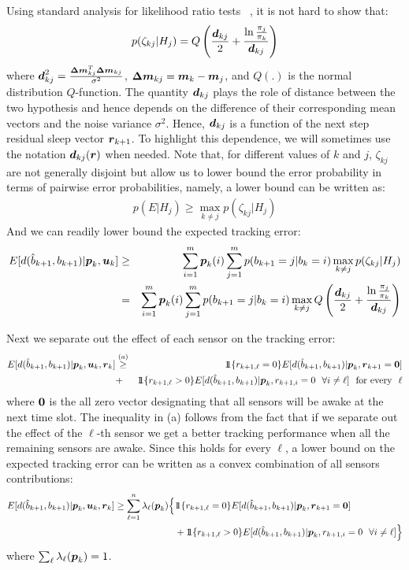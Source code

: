 \documentclass[journal,draftcls,onecolumn,11pt]{IEEEtran}
\newcommand{\emb}[1]{\text{\boldmath{$#1$}}}
\newcommand{\indic}[1]{\mbox{$1\!\!1$}{\{#1\}}}
\begin{document}
Using standard analysis for likelihood ratio tests ~\cite{poor,levy}, it is not hard to show that:
\begin{equation}
 p(\zeta_{kj}|H_j)=Q\left(\frac{\emb{d}_{kj}}{2}+\frac{\ln\frac{\pi_j}{\pi_k}}{\emb{d}_{kj}}\right)
 \end{equation}
where $\emb{d}^2_{kj}=\frac{\emb{\Delta m}_{kj}^T\emb{\Delta m}_{kj}}{\sigma^2}$, $\emb{\Delta m}_{kj}=\emb{m}_k-\emb{m}_j$, and $Q(.)$ is the normal distribution $Q$-function. The quantity $\emb{d}_{kj}$ plays the role of distance between the two hypothesis and hence depends on the difference of their corresponding mean vectors and the noise variance $\sigma^2$. Hence, $\emb{d}_{kj}$ is a function of the next step residual sleep vector $\emb{r}_{k+1}$. To highlight this dependence, we will sometimes use the notation $\emb{d}_{kj}(\emb{r})$ when needed. Note that, for different values of $k$ and $j$, $\zeta_{kj}$ are not generally disjoint but allow us to lower bound the error probability in terms of pairwise error probabilities, namely, a lower bound can be written as:
\begin{eqnarray}
p(E|H_j)\geq\max_{k\ne j} p(\zeta_{kj}|H_j)
\end{eqnarray}
And we can readily lower bound the expected tracking error:
\begin{eqnarray}
E[d(\hat{b}_{k+1},b_{k+1})|\emb{p}_k,\emb{u}_k]&\geq&\sum_{i=1}^m \emb{p}_k(i)\sum_{j=1}^m p(b_{k+1}=j|b_k=i)\max_{k\ne j} p(\zeta_{kj}|H_j)\nonumber\\
& = &\sum_{i=1}^m \emb{p}_k(i)\sum_{j=1}^m p(b_{k+1}=j|b_k=i)\max_{k\ne j}Q\left(\frac{\emb{d}_{kj}}{2}+\frac{\ln\frac{\pi_j}{\pi_k}}{\emb{d}_{kj}}\right)
\label{eq:lb_tracking}
\end{eqnarray}

Next we separate out the effect of each sensor on the tracking error:
\begin{eqnarray}
E[d(\hat{b}_{k+1},b_{k+1})|\emb{p}_k,\emb{u}_k,\emb{r}_k]&\buildrel (a)\over\geq&\indic{r_{k+1,\ell}=0}E[d(\hat{b}_{k+1},b_{k+1})|\emb{p}_k,\emb{r}_{k+1}=\emb{0}]\nonumber\\
&+& \indic{r_{k+1,\ell}>0}E[d(\hat{b}_{k+1},b_{k+1})|\emb{p}_k,r_{k+1,i}=0 ~~\forall i\ne\ell]~~\mbox{for every}~~\ell\nonumber\\
\label{eq,trick}
\end{eqnarray}
where $\emb{0}$ is the all zero vector designating that all sensors will be awake at the next time slot. The inequality in
(a) follows from the fact that if we separate out the effect of the $\ell$-th sensor we get a better tracking performance when all the remaining sensors are awake. Since this holds for every $\ell$, a lower bound on the expected tracking error can be written as a convex combination of all sensors contributions:
\begin{align}
E[d(\hat{b}_{k+1},b_{k+1})|\emb{p}_k,\emb{u}_k,\emb{r}_k]\geq
\sum_{\ell=1}^n \lambda_{\ell}(\emb{p}_k)\Big\{&\indic{r_{k+1,\ell}=0}E[d(\hat{b}_{k+1},b_{k+1})|\emb{p}_k,\emb{r}_{k+1}=\emb{0}]\nonumber\\
&+ \indic{r_{k+1,\ell}>0}E[d(\hat{b}_{k+1},b_{k+1})|\emb{p}_k,r_{k+1,i}=0 ~~\forall i\ne\ell]\Big\}
\end{align}
where $\sum_{\ell}\lambda_{\ell}(\emb{p}_k) = 1$.
\end{document}
